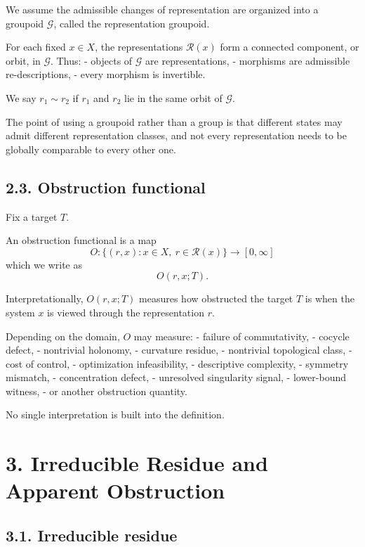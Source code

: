 \documentclass[
]{article}
\begin{document}
We assume the admissible changes of representation are organized into a
groupoid \(\mathcal{G}\), called the representation groupoid.

For each fixed \(x \in X\), the representations \(\mathcal{R}(x)\) form
a connected component, or orbit, in \(\mathcal{G}\). Thus: - objects of
\(\mathcal{G}\) are representations, - morphisms are admissible
re-descriptions, - every morphism is invertible.

We say \(r_1 \sim r_2\) if \(r_1\) and \(r_2\) lie in the same orbit of
\(\mathcal{G}\).

The point of using a groupoid rather than a group is that different
states may admit different representation classes, and not every
representation needs to be globally comparable to every other one.

\subsection{2.3. Obstruction functional}\label{obstruction-functional}

Fix a target \(T\).

An obstruction functional is a map \[
O: \{(r,x) : x \in X,\ r \in \mathcal{R}(x)\} \to [0,\infty]
\] which we write as \[
O(r,x;T).
\]

Interpretationally, \(O(r,x;T)\) measures how obstructed the target
\(T\) is when the system \(x\) is viewed through the representation
\(r\).

Depending on the domain, \(O\) may measure: - failure of commutativity,
- cocycle defect, - nontrivial holonomy, - curvature residue, -
nontrivial topological class, - cost of control, - optimization
infeasibility, - descriptive complexity, - symmetry mismatch, -
concentration defect, - unresolved singularity signal, - lower-bound
witness, - or another obstruction quantity.

No single interpretation is built into the definition.

\section{3. Irreducible Residue and Apparent
Obstruction}\label{irreducible-residue-and-apparent-obstruction}

\subsection{3.1. Irreducible residue}\label{irreducible-residue}
\end{document}
